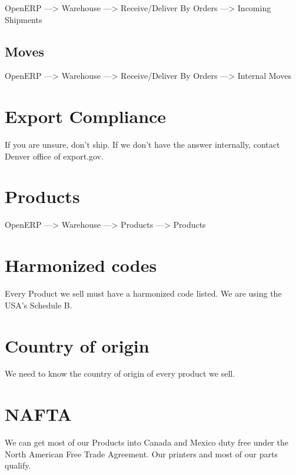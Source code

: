 OpenERP ---> Warehouse ---> Receive/Deliver By Orders ---> Incoming Shipments

\subsection{Moves}

OpenERP ---> Warehouse ---> Receive/Deliver By Orders ---> Internal Moves

\section{Export Compliance}
If you are unsure, don't ship. If we don't have the answer internally, contact
Denver office of export.gov.

\section{Products}

OpenERP ---> Warehouse ---> Products ---> Products

\section{Harmonized codes}
Every Product we sell must have a harmonized code listed. We are using the
USA's Schedule B.

\section{Country of origin}
We need to know the country of origin of every product we sell.

\section{NAFTA}
We can get most of our Products into Canada and Mexico duty free under the
North American Free Trade Agreement. Our printers and most of our parts
qualify.

